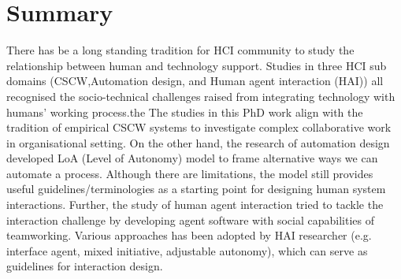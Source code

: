 

\section{Summary}


There has be a long standing tradition for HCI community to study the relationship between human and technology support. Studies in three HCI sub domains (CSCW,Automation design, and Human agent interaction (HAI)) all recognised the socio-technical challenges raised from integrating technology with humans' working process.the  The studies in this PhD work align with the tradition of empirical CSCW systems to investigate complex collaborative work in organisational setting.  On the other hand, the research of automation design developed LoA (Level of Autonomy) model to frame alternative ways we can automate a process. Although there are limitations, the model still provides useful guidelines/terminologies as a starting point for designing human system interactions. Further, the study of human agent interaction tried to tackle the interaction challenge by developing agent software with social capabilities of teamworking. Various approaches has been adopted by HAI researcher (e.g. interface agent, mixed initiative, adjustable autonomy), which can serve as guidelines for interaction design.\\

